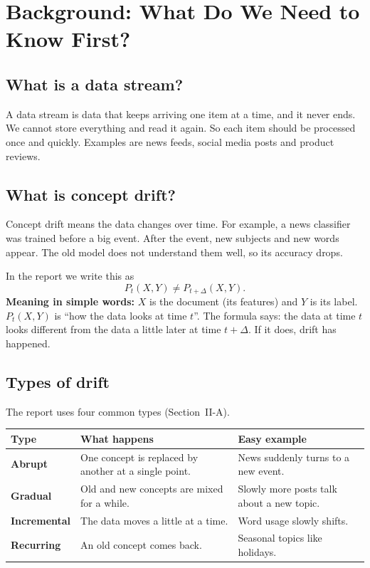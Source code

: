 \documentclass[11pt,a4paper]{article}
\begin{document}
\section{Background: What Do We Need to Know First?}

\subsection{What is a data stream?}
A data stream is data that keeps arriving one item at a time, and it never ends. We cannot store everything and read it again. So each item should be processed once and quickly. Examples are news feeds, social media posts and product reviews.

\subsection{What is concept drift?}
Concept drift means the data changes over time. For example, a news classifier was trained before a big event. After the event, new subjects and new words appear. The old model does not understand them well, so its accuracy drops.

In the report we write this as
\[
P_t(X,Y)\neq P_{t+\Delta}(X,Y).
\]
\textbf{Meaning in simple words:} $X$ is the document (its features) and $Y$ is its label. $P_t(X,Y)$ is ``how the data looks at time $t$''. The formula says: the data at time $t$ looks different from the data a little later at time $t+\Delta$. If it does, drift has happened.

\subsection{Types of drift}
The report uses four common types (Section~II-A).

\begin{center}
\begin{tabular}{@{}>{\bfseries}p{2.6cm}p{6.5cm}p{4.5cm}@{}}
\toprule
Type & What happens & Easy example \\
\midrule
Abrupt & One concept is replaced by another at a single point. & News suddenly turns to a new event. \\
Gradual & Old and new concepts are mixed for a while. & Slowly more posts talk about a new topic. \\
Incremental & The data moves a little at a time. & Word usage slowly shifts. \\
Recurring & An old concept comes back. & Seasonal topics like holidays. \\
\bottomrule
\end{tabular}
\end{center}
\end{document}
